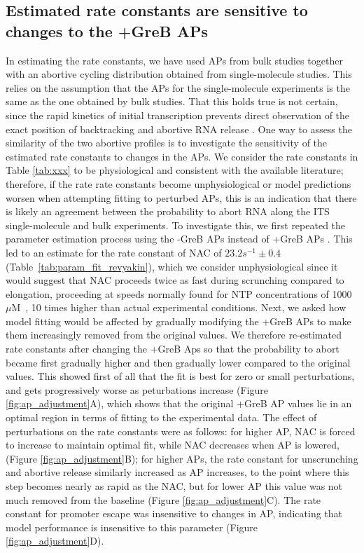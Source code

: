 \subsection{Estimated rate constants are sensitive to changes to the +GreB 
APs}
In estimating the rate constants, we have used APs from
bulk studies together with an abortive cycling distribution obtained from
single-molecule studies. This relies on the assumption that the APs for the
single-molecule experiments is the same as the one obtained by bulk studies.
That this holds true is not certain, since the rapid kinetics of initial
transcription prevents direct observation of the exact position of
backtracking and abortive RNA release \cite{margeat_direct_2006,
revyakin_abortive_2006}. One way to assess the similarity of the two abortive
profiles is to investigate the sensitivity of the estimated rate constants to
changes in the APs. We consider the rate constants in Table
\ref{tab:xxx} to be physiological and consistent with the available
literature; therefore, if the rate rate constants become unphysiological or
model predictions worsen when attempting fitting to perturbed APs, this
is an indication that there is likely an agreement between the probability to
abort RNA along the ITS single-molecule and bulk experiments. To investigate
this, we first repeated the parameter estimation process using the -GreB APs
instead of +GreB APs \cite{hsu_initial_2006}. This led to an estimate for the
rate constant of NAC of $23.2 s^{-1} \pm 0.4$
(Table~\ref{tab:param_fit_revyakin}), which we consider unphysiological since
it would suggest that NAC proceeds twice as fast during scrunching compared to
elongation, proceeding at speeds normally found for NTP concentrations of 1000
$\mu$M~\cite{bai_mechanochemical_2007}, 10 times higher than actual
experimental conditions. Next, we asked how model fitting would be affected by
gradually modifying the +GreB APs to make them increasingly removed from the
original values. We therefore re-estimated rate constants after changing the
+GreB Aps so that the probability to abort became first gradually higher and
then gradually lower compared to the original values. This showed first
of all that the fit is best for zero or small perturbations, and gets
progressively worse as peturbations increase (Figure
\ref{fig:ap_adjustment}A), which shows that the original +GreB AP values lie
in an optimal region in terms of fitting to the experimental data. The effect
of perturbations on the rate constants were as follows: for higher AP, NAC is
forced to increase to maintain optimal fit, while NAC decreases when AP is
lowered, (Figure \ref{fig:ap_adjustment}B); for higher APs, the rate constant
for unscrunching and abortive release similarly increased as AP increases, to
the point where this step becomes nearly as rapid as the NAC, but for lower AP
this value was not much removed from the baseline (Figure
\ref{fig:ap_adjustment}C). The rate constant for promoter escape was
insensitive to changes in AP, indicating that model performance is insensitive
to this parameter (Figure \ref{fig:ap_adjustment}D).

